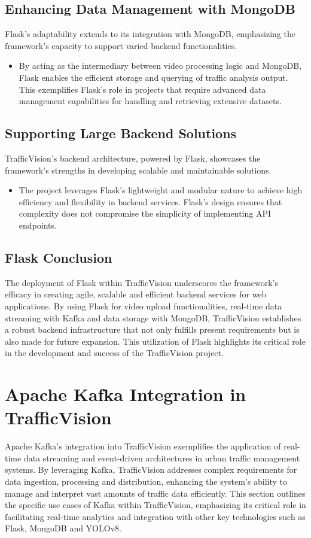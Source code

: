 \subsection{Enhancing Data Management with MongoDB}
Flask's adaptability extends to its integration with MongoDB, emphasizing the framework's capacity to support varied backend functionalities.
\begin{itemize}
    \item By acting as the intermediary between video processing logic and MongoDB, Flask enables the efficient storage and querying of traffic analysis output. This exemplifies Flask's role in projects that require advanced data management capabilities for handling and retrieving extensive datasets.
\end{itemize}

\subsection{Supporting Large Backend Solutions}
TrafficVision's backend architecture, powered by Flask, showcases the framework's strengths in developing scalable and maintainable solutions.
\begin{itemize}
    \item The project leverages Flask's lightweight and modular nature to achieve high efficiency and flexibility in backend services. Flask's design ensures that complexity does not compromise the simplicity of implementing API endpoints.
\end{itemize}

\subsection{Flask Conclusion}
The deployment of Flask within TrafficVision underscores the framework's efficacy in creating agile, scalable and efficient backend services for web applications. By using Flask for video upload functionalities, real-time data streaming with Kafka and data storage with MongoDB, TrafficVision establishes a robust backend infrastructure that not only fulfills present requirements but is also made for future expansion. This utilization of Flask highlights its critical role in the development and success of the TrafficVision project.


\section{Apache Kafka Integration in TrafficVision}
Apache Kafka's integration into TrafficVision exemplifies the application of real-time data streaming and event-driven architectures in urban traffic management systems. By leveraging Kafka, TrafficVision addresses complex requirements for data ingestion, processing and distribution, enhancing the system's ability to manage and interpret vast amounts of traffic data efficiently. This section outlines the specific use cases of Kafka within TrafficVision, emphasizing its critical role in facilitating real-time analytics and integration with other key technologies such as Flask, MongoDB and YOLOv8.

